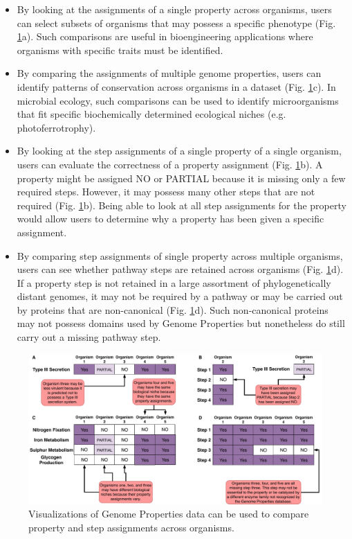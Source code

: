 \begin{itemize}
\item By looking at the assignments of a single property across organisms, users can select subsets of organisms that may possess a specific phenotype (Fig. \ref{fig:client-analysis-types}a). Such comparisons are useful in bioengineering applications where organisms with specific traits must be identified.
\item By comparing the assignments of multiple genome properties, users can identify patterns of conservation across organisms in a dataset (Fig. \ref{fig:client-analysis-types}c). In microbial ecology, such comparisons can be used to identify microorganisms that fit specific biochemically determined ecological niches (e.g. photoferrotrophy).
\item By looking at the step assignments of a single property of a single organism, users can evaluate the correctness of a property assignment (Fig. \ref{fig:client-analysis-types}b). A property might be assigned NO or PARTIAL because it is missing only a few required steps. However, it may possess many other steps that are not required (Fig. \ref{fig:client-analysis-types}b). Being able to look at all step assignments for the property would allow users to determine why a property has been given a specific assignment.
\item By comparing step assignments of single property across multiple organisms, users can see whether pathway steps are retained across organisms (Fig. \ref{fig:client-analysis-types}d). If a property step is not retained in a large assortment of phylogenetically distant genomes, it may not be required by a pathway or may be carried out by proteins that are non-canonical (Fig. \ref{fig:client-analysis-types}d). Such non-canonical proteins may not possess domains used by Genome Properties but nonetheless do still carry out a missing pathway step.
\end{itemize}

\begin{figure}[!ht]
  \centering
	\includegraphics[width=\textwidth]{media/analysis_types.pdf}
	 \caption{Visualizations of Genome Properties data can be used to compare property and step assignments across organisms.}
	 \label{fig:client-analysis-types}
\end{figure}

